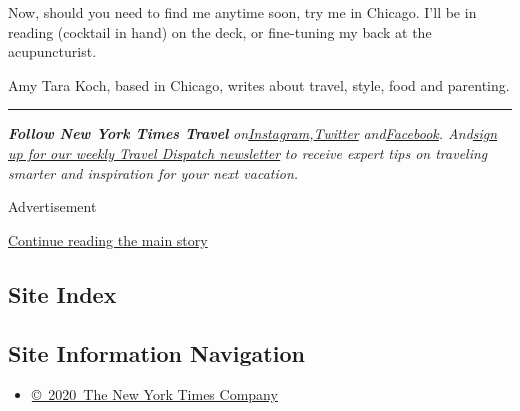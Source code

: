 Now, should you need to find me anytime soon, try me in Chicago. I'll be
in reading (cocktail in hand) on the deck, or fine-tuning my back at the
acupuncturist.

Amy Tara Koch, based in Chicago, writes about travel, style, food and
parenting.

\begin{center}\rule{0.5\linewidth}{\linethickness}\end{center}

\emph{\textbf{Follow New York Times Travel}}
\emph{on}\href{https://www.instagram.com/nytimestravel/}{\emph{Instagram}}\emph{,}\href{https://twitter.com/nytimestravel}{\emph{Twitter}}
\emph{and}\href{https://www.facebook.com/nytimestravel/}{\emph{Facebook}}\emph{.
And}\href{https://www.nytimes.com/newsletters/traveldispatch}{\emph{sign
up for our weekly Travel Dispatch newsletter}} \emph{to receive expert
tips on traveling smarter and inspiration for your next vacation.}

Advertisement

\protect\hyperlink{after-bottom}{Continue reading the main story}

\hypertarget{site-index}{%
\subsection{Site Index}\label{site-index}}

\hypertarget{site-information-navigation}{%
\subsection{Site Information
Navigation}\label{site-information-navigation}}

\begin{itemize}
\tightlist
\item
  \href{https://help.nytimes.com/hc/en-us/articles/115014792127-Copyright-notice}{©~2020~The
  New York Times Company}
\end{itemize}

